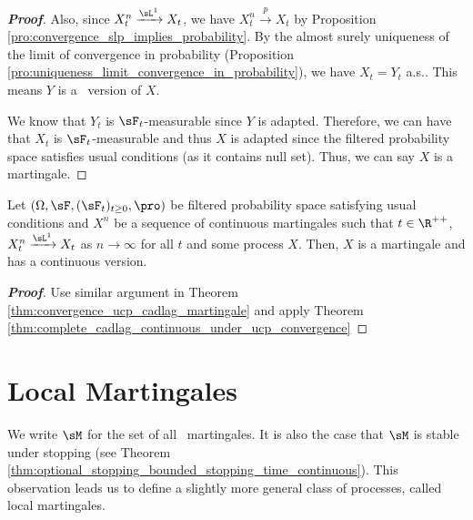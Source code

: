 \begin{proof}[\bf Proof]
Also, since $X^n_t \xrightarrow{\sL^1} X_t$, we have $X^n_t \xrightarrow{p} X_t$ by Proposition \ref{pro:convergence_slp_implies_probability}. By the almost surely uniqueness of the limit of convergence in probability (Proposition \ref{pro:uniqueness_limit_convergence_in_probability}), we have $X_t = Y_t$ a.s.. This means $Y$ is a \cadlag\ version of $X$.

We know that $Y_t$ is $\sF_t$-measurable since $Y$ is adapted. Therefore, we can have that $X_t$ is $\sF_t$-measurable and thus $X$ is adapted since the filtered probability space satisfies usual conditions (as it contains null set). Thus, we can say $X$ is a martingale.
\end{proof}

\begin{corollary}\label{cor:convergence_ucp_continuous_martingale}
Let $(\Omega,\sF,(\sF_t)_{t\geq 0},\pro)$ be filtered probability space satisfying usual conditions and $X^n$ be a sequence of continuous martingales such that $t\in \R^{++}$, $X^n_t \xrightarrow{\sL^1} X_t$ as $n\to \infty$ for all $t$ and some process $X$. Then, $X$ is a martingale and has a continuous version.
\end{corollary}

\begin{proof}[\bf Proof]
Use similar argument in Theorem \ref{thm:convergence_ucp_cadlag_martingale} and apply Theorem \ref{thm:complete_cadlag_continuous_under_ucp_convergence}
\end{proof}




\section{Local Martingales}

We write $\sM$ for the set of all \cadlag\ martingales. It is also the case that $\sM$ is stable under stopping (see Theorem \ref{thm:optional_stopping_bounded_stopping_time_continuous}). This observation leads us to define a slightly more general class of processes, called local martingales.

